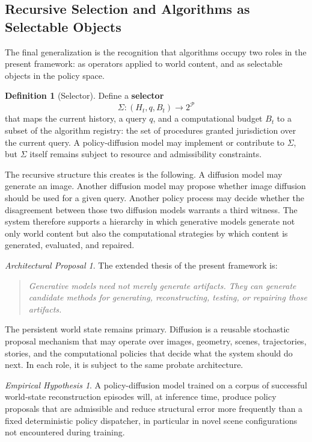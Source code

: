 \documentclass[11pt,a4paper]{article}
\theoremstyle{plain}
\theoremstyle{definition}
\newtheorem{definition}[theorem]{Definition}
\theoremstyle{remark}
\newtheorem{hypothesis}[theorem]{Empirical Hypothesis}
\newtheorem{proposal}[theorem]{Architectural Proposal}
\begin{document}
\subsection{Recursive Selection and Algorithms as Selectable Objects}

The final generalization is the recognition that algorithms occupy two roles in the present framework: as operators applied to world content, and as selectable objects in the policy space.

\begin{definition}[Selector]
Define a \textbf{selector}
\[
\Sigma : (H_t, q, B_t) \to 2^{\mathcal{P}}
\]
that maps the current history, a query $q$, and a computational budget $B_t$ to a subset of the algorithm registry: the set of procedures granted jurisdiction over the current query. A policy-diffusion model may implement or contribute to $\Sigma$, but $\Sigma$ itself remains subject to resource and admissibility constraints.
\end{definition}

The recursive structure this creates is the following. A diffusion model may generate an image. Another diffusion model may propose whether image diffusion should be used for a given query. Another policy process may decide whether the disagreement between those two diffusion models warrants a third witness. The system therefore supports a hierarchy in which generative models generate not only world content but also the computational strategies by which content is generated, evaluated, and repaired.

\begin{proposal}
\label{prop:recursive}
The extended thesis of the present framework is:
\begin{quote}
\itshape
Generative models need not merely generate artifacts. They can generate candidate methods for generating, reconstructing, testing, or repairing those artifacts.
\end{quote}
The persistent world state remains primary. Diffusion is a reusable stochastic proposal mechanism that may operate over images, geometry, scenes, trajectories, stories, and the computational policies that decide what the system should do next. In each role, it is subject to the same probate architecture.
\end{proposal}

\begin{hypothesis}
\label{hyp:policy-diffusion}
A policy-diffusion model trained on a corpus of successful world-state reconstruction episodes will, at inference time, produce policy proposals that are admissible and reduce structural error more frequently than a fixed deterministic policy dispatcher, in particular in novel scene configurations not encountered during training.
\end{hypothesis}
\end{document}
